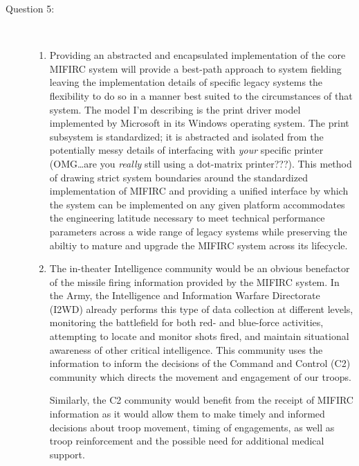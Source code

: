 \documentclass[letterpaper,10pt]{article}
\begin{document}
\begin{description}
\item[Question 5:]\ 
	\begin{enumerate}[A: ]
	\item Providing an abstracted and encapsulated implementation of the core MIFIRC system will provide a best-path approach to system fielding leaving the implementation details of specific legacy systems the flexibility to do so in a manner best suited to the circumstances of that system.  The model I'm describing is the print driver model implemented by Microsoft in its Windows operating system.  The print subsystem is standardized; it is abstracted and isolated from the potentially messy details of interfacing with \emph{your} specific printer (OMG\dots are you \emph{really} still using a dot-matrix printer???).  This method of drawing strict system boundaries around the standardized implementation of MIFIRC and providing a unified interface by which the system can be implemented on any given platform accommodates the engineering latitude necessary to meet technical performance parameters across a wide range of legacy systems while preserving the abiltiy to mature and upgrade the MIFIRC system across its lifecycle.
	\item The in-theater Intelligence community would be an obvious benefactor of the missile firing information provided by the MIFIRC system.  In the Army, the Intelligence and Information Warfare Directorate (I2WD) already performs this type of data collection at different levels, monitoring the battlefield for both red- and blue-force activities, attempting to locate and monitor shots fired, and maintain situational awareness of other critical intelligence.  This community uses the information to inform the decisions of the Command and Control (C2) community which directs the movement and engagement of our troops.
	
	Similarly, the C2 community would benefit from the receipt of MIFIRC information as it would allow them to make timely and informed decisions about troop movement, timing of engagements, as well as troop reinforcement and the possible need for additional medical support.
	\end{enumerate}

\end{description}
\end{document}

